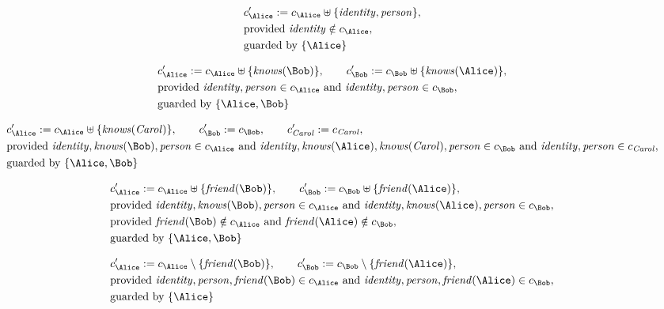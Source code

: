 \begin{align*}
&
c'_
{
\Alice
}
 := 
c_
{
\Alice
}
 \uplus 
\{
\mathit{
identity
}
,
\mathit{
person
}
\}
,\\
&
\text{provided } 
\mathit{
identity
}
 \notin c_
{
\Alice
}
,\\
&
\text{guarded by } \{
\Alice
\}
\end{align*}

\begin{align*}
&
c'_
{
\Alice
}
 := 
c_
{
\Alice
}
 \uplus 
\{
\mathit{
knows
}
(
\Bob
)
\}
, \qquad 
c'_
{
\Bob
}
 := 
c_
{
\Bob
}
 \uplus 
\{
\mathit{
knows
}
(
\Alice
)
\}
,\\
&
\text{provided } 
\mathit{
identity
}
,
\mathit{
person
}
 \in c_
{
\Alice
}
 \text{ and } 
\mathit{
identity
}
,
\mathit{
person
}
 \in c_
{
\Bob
}
,\\
&
\text{guarded by } \{
\Alice
,
\Bob
\}
\end{align*}

\begin{align*}
&
c'_
{
\Alice
}
 := 
c_
{
\Alice
}
 \uplus 
\{
\mathit{
knows
}
(
\mathit{Carol}
)
\}
, \qquad 
c'_
{
\Bob
}
 := 
c_
{
\Bob
}
, \qquad 
c'_
{
\mathit{Carol}
}
 := 
c_
{
\mathit{Carol}
}
,\\
&
\text{provided } 
\mathit{
identity
}
,
\mathit{
knows
}
(
\Bob
)
,
\mathit{
person
}
 \in c_
{
\Alice
}
 \text{ and } 
\mathit{
identity
}
,
\mathit{
knows
}
(
\Alice
)
,
\mathit{
knows
}
(
\mathit{Carol}
)
,
\mathit{
person
}
 \in c_
{
\Bob
}
 \text{ and } 
\mathit{
identity
}
,
\mathit{
person
}
 \in c_
{
\mathit{Carol}
}
,\\
&
\text{guarded by } \{
\Alice
,
\Bob
\}
\end{align*}

\begin{align*}
&
c'_
{
\Alice
}
 := 
c_
{
\Alice
}
 \uplus 
\{
\mathit{
friend
}
(
\Bob
)
\}
, \qquad 
c'_
{
\Bob
}
 := 
c_
{
\Bob
}
 \uplus 
\{
\mathit{
friend
}
(
\Alice
)
\}
,\\
&
\text{provided } 
\mathit{
identity
}
,
\mathit{
knows
}
(
\Bob
)
,
\mathit{
person
}
 \in c_
{
\Alice
}
 \text{ and } 
\mathit{
identity
}
,
\mathit{
knows
}
(
\Alice
)
,
\mathit{
person
}
 \in c_
{
\Bob
}
,\\
&
\text{provided } 
\mathit{
friend
}
(
\Bob
)
 \notin c_
{
\Alice
}
 \text{ and } 
\mathit{
friend
}
(
\Alice
)
 \notin c_
{
\Bob
}
,\\
&
\text{guarded by } \{
\Alice
,
\Bob
\}
\end{align*}

\begin{align*}
&
c'_
{
\Alice
}
 := 
c_
{
\Alice
}
 \setminus 
\{
\mathit{
friend
}
(
\Bob
)
\}
, \qquad 
c'_
{
\Bob
}
 := 
c_
{
\Bob
}
 \setminus 
\{
\mathit{
friend
}
(
\Alice
)
\}
,\\
&
\text{provided } 
\mathit{
identity
}
,
\mathit{
person
}
,
\mathit{
friend
}
(
\Bob
)
 \in c_
{
\Alice
}
 \text{ and } 
\mathit{
identity
}
,
\mathit{
person
}
,
\mathit{
friend
}
(
\Alice
)
 \in c_
{
\Bob
}
,\\
&
\text{guarded by } \{
\Alice
\}
\end{align*}
